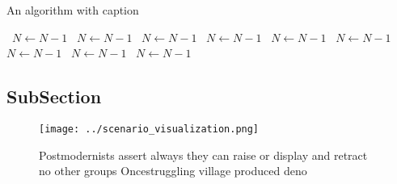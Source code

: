 \documentclass[a4paper]{article}
\begin{document}
\begin{algorithm}
\caption{An algorithm with caption}
\begin{algorithmic}
\    \State $N \gets N - 1$
\    \State $N \gets N - 1$
\    \State $N \gets N - 1$
\    \State $N \gets N - 1$
\    \State $N \gets N - 1$
\    \State $N \gets N - 1$
\    \State $N \gets N - 1$
\    \State $N \gets N - 1$
\    \State $N \gets N - 1$
\EndWhile
\end{algorithmic}
\end{algorithm}

\subsection{SubSection}

\begin{figure}
\centering
\texttt{[image: ../scenario\_visualization.png]}
\caption{Postmodernists assert always they can raise or display and retract no other groups Oncestruggling village produced deno
}
\end{figure}
 
\end{document}
